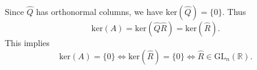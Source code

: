 Since $\widehat{Q}$ has orthonormal columns, we have $\text{ker}(\widehat{Q}) = \{0\}$. Thus
$$\text{ker}(A) = \text{ker}(\widehat{Q}\widehat{R}) = \text{ker}(\widehat{R}). $$
This implies 
$$\text{ker}(A) = \{0\} \Leftrightarrow   \text{ker}(\widehat{R})= \{0\} \Leftrightarrow\widehat{R}\in \text{GL}_n(\mathbb{R}). $$
